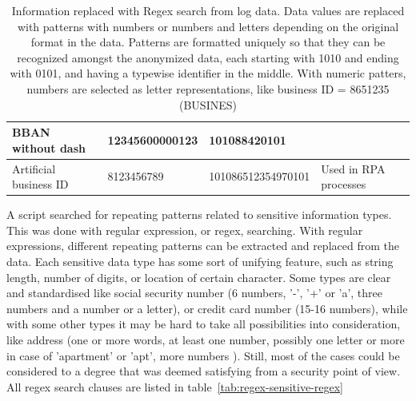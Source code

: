\begin{table}[]
\begin{tabularx}{\textwidth}{|L{0.17\textwidth}|L{0.27\textwidth}|L{0.30\textwidth}|Y|}
        BBAN without dash &
        12345600000123 &
        101088420101 &
        \\ \hline
        Artificial business ID &
        8123456789 &
        101086512354970101 &
        Used in RPA processes
        \\ \hline
    \end{tabularx}
    \caption{Information replaced with Regex search from log data.
        Data values are replaced with patterns with numbers or numbers and letters
        depending on the original format in the data.
        Patterns are formatted uniquely so that they can be recognized amongst the anonymized data,
        each starting with 1010 and ending with 0101,
        and having a typewise identifier in the middle.
        With numeric patters,
        numbers are selected as letter representations,
        like business ID = 8651235 (BUSINES)}
    \label{tab:regex-sensitive-info}
\end{table}

A script searched for repeating patterns related to sensitive information types.
This was done with regular expression, or regex, searching.
With regular expressions,
different repeating patterns can be extracted and replaced from the data.
Each sensitive data type has some sort of unifying feature,
such as string length, number of digits, or location of certain character.\cite{li2008regular}
Some types are clear and standardised like social security number
(6 numbers, '-', '+' or 'a', three numbers and a number or a letter),
or credit card number (15-16 numbers),
while with some other types it may be hard
to take all possibilities into consideration,
like address (one or more words, at least one number,
possibly one letter or more in case of 'apartment' or 'apt', more numbers \etc).
Still,
most of the cases could be considered to a degree
that was deemed satisfying from a security point of view.
All regex search clauses are listed in table~\ref{tab:regex-sensitive-regex}

